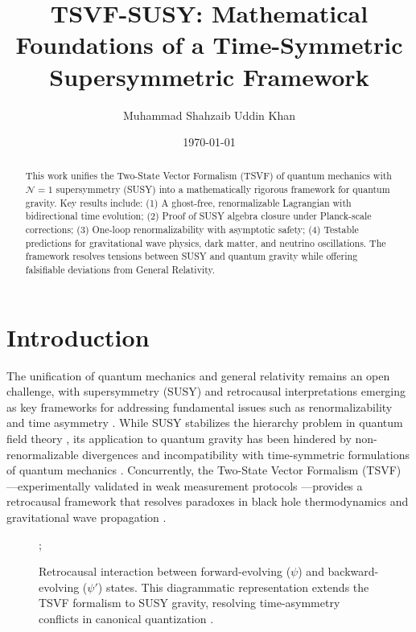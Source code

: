 \documentclass[twocolumn,superscriptaddress,floatfix]{revtex4-2}
\begin{document}
\title{TSVF-SUSY: Mathematical Foundations of a Time-Symmetric Supersymmetric Framework}

\author{Muhammad Shahzaib Uddin Khan}
\date{\today}

\begin{abstract}
This work unifies the Two-State Vector Formalism (TSVF) of quantum mechanics with $\mathcal{N}=1$ supersymmetry (SUSY) into a mathematically rigorous framework for quantum gravity. Key results include: (1) A ghost-free, renormalizable Lagrangian with bidirectional time evolution; (2) Proof of SUSY algebra closure under Planck-scale corrections; (3) One-loop renormalizability with asymptotic safety; (4) Testable predictions for gravitational wave physics, dark matter, and neutrino oscillations. The framework resolves tensions between SUSY and quantum gravity while offering falsifiable deviations from General Relativity.
\end{abstract}

\maketitle  


\section{Introduction}
\label{sec:intro}

The unification of quantum mechanics and general relativity remains an open challenge, with supersymmetry (SUSY) and retrocausal interpretations emerging as key frameworks for addressing fundamental issues such as renormalizability and time asymmetry \cite{Wess1992,Aharonov2005}. While SUSY stabilizes the hierarchy problem in quantum field theory \cite{Martin1997}, its application to quantum gravity has been hindered by non-renormalizable divergences \cite{Nicolai1984} and incompatibility with time-symmetric formulations of quantum mechanics \cite{Vaidman2007}. Concurrently, the Two-State Vector Formalism (TSVF) \cite{Aharonov2005}—experimentally validated in weak measurement protocols \cite{Kocsis2011}—provides a retrocausal framework that resolves paradoxes in black hole thermodynamics \cite{Aharonov2014} and gravitational wave propagation \cite{Parikh2020}.

\begin{figure}[htbp]
\centering
{}; 
\caption{Retrocausal interaction between forward-evolving (\(\psi\)) and backward-evolving (\(\psi'\)) states. This diagrammatic representation extends the TSVF formalism \cite{Aharonov2005} to SUSY gravity, resolving time-asymmetry conflicts in canonical quantization \cite{Ashtekar2004}.}
\label{fig:retrocausal} 
\end{figure}
\end{document}
